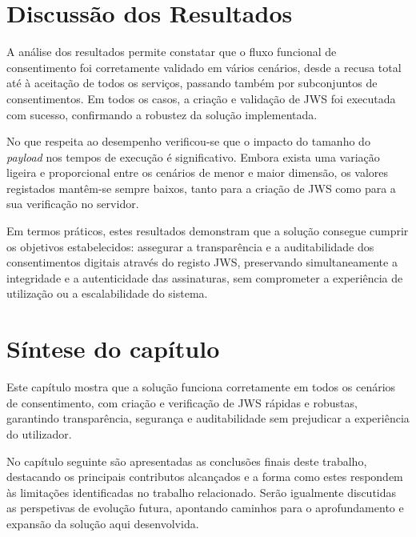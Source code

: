 \section{Discussão dos Resultados}

A análise dos resultados permite constatar que o fluxo funcional de consentimento foi corretamente validado em vários cenários, desde a recusa total até à aceitação de todos os serviços, passando também por subconjuntos de consentimentos. Em todos os casos, a criação e validação de JWS foi executada com sucesso, confirmando a robustez da solução implementada.

No que respeita ao desempenho verificou-se que o impacto do tamanho do \textit{payload} nos tempos de execução é significativo. Embora exista uma variação ligeira e proporcional entre os cenários de menor e maior dimensão, os valores registados mantêm-se sempre baixos, tanto para a criação de JWS como para a sua verificação no servidor.

Em termos práticos, estes resultados demonstram que a solução consegue cumprir os objetivos estabelecidos: assegurar a transparência e a auditabilidade dos consentimentos digitais através do registo JWS, preservando simultaneamente a integridade e a autenticidade das assinaturas, sem comprometer a experiência de utilização ou a escalabilidade do sistema.

\section {Síntese do capítulo}

Este capítulo mostra que a solução funciona corretamente em todos os cenários de consentimento, com criação e verificação de JWS rápidas e robustas, garantindo transparência, segurança e auditabilidade sem prejudicar a experiência do utilizador.

No capítulo seguinte são apresentadas as conclusões finais deste trabalho, destacando os principais contributos alcançados e a forma como estes respondem às limitações identificadas no trabalho relacionado. Serão igualmente discutidas as perspetivas de evolução futura, apontando caminhos para o aprofundamento e expansão da solução aqui desenvolvida.

